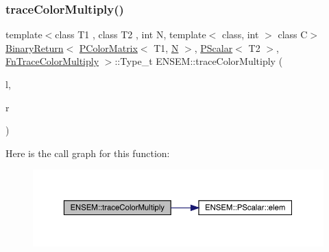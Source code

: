 \subsubsection{\texorpdfstring{traceColorMultiply()}{traceColorMultiply()}\hspace{0.1cm}{\footnotesize\ttfamily [2/3]}}
{\footnotesize\ttfamily template$<$class T1 , class T2 , int N, template$<$ class, int $>$ class C$>$ \\
\mbox{\hyperlink{structENSEM_1_1BinaryReturn}{Binary\+Return}}$<$ \mbox{\hyperlink{classENSEM_1_1PColorMatrix}{P\+Color\+Matrix}}$<$ T1, \mbox{\hyperlink{adat__devel_2lib_2hadron_2operator__name__util_8cc_a7722c8ecbb62d99aee7ce68b1752f337}{N}} $>$, \mbox{\hyperlink{classENSEM_1_1PScalar}{P\+Scalar}}$<$ T2 $>$, \mbox{\hyperlink{structENSEM_1_1FnTraceColorMultiply}{Fn\+Trace\+Color\+Multiply}} $>$\+::Type\+\_\+t E\+N\+S\+E\+M\+::trace\+Color\+Multiply (\begin{DoxyParamCaption}\item[{const \mbox{\hyperlink{classENSEM_1_1PColorMatrix}{P\+Color\+Matrix}}$<$ T1, \mbox{\hyperlink{adat__devel_2lib_2hadron_2operator__name__util_8cc_a7722c8ecbb62d99aee7ce68b1752f337}{N}} $>$ \&}]{l,  }\item[{const \mbox{\hyperlink{classENSEM_1_1PScalar}{P\+Scalar}}$<$ T2 $>$ \&}]{r }\end{DoxyParamCaption})\hspace{0.3cm}{\ttfamily [inline]}}

Here is the call graph for this function\+:\nopagebreak
\begin{figure}[H]
\begin{center}
\leavevmode
\includegraphics[width=350pt]{dd/d2f/group__primcolormatrix_gac1ebb50e5da5705b401fc6a361b951c5_cgraph}
\end{center}
\end{figure}
\mbox{\label{group__primcolormatrix_ga0e0db533c0e6dc778fc9f271537b96eb}} 
